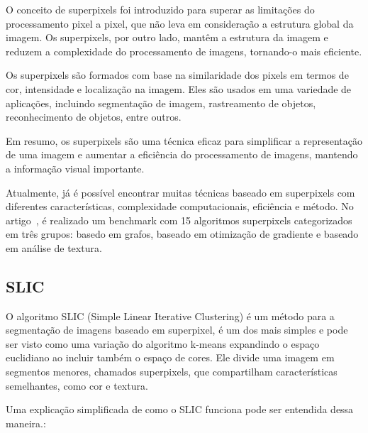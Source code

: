 O conceito de superpixels foi introduzido para superar as limitações
do processamento pixel a pixel, que não leva em consideração a
estrutura global da imagem. Os superpixels, por outro lado, mantêm a
estrutura da imagem e reduzem a complexidade do processamento de
imagens, tornando-o mais eficiente.

Os superpixels são formados com base na similaridade dos pixels em
termos de cor, intensidade e localização na imagem. Eles são usados em
uma variedade de aplicações, incluindo segmentação de imagem,
rastreamento de objetos, reconhecimento de objetos, entre outros.

Em resumo, os superpixels são uma técnica eficaz para simplificar a
representação de uma imagem e aumentar a eficiência do processamento
de imagens, mantendo a informação visual importante.

Atualmente, já é possível encontrar muitas técnicas baseado em
superpixels com diferentes características, complexidade
computacionais, eficiência e método. No
artigo~\cite{SuperPixelBenchmark2017}, é realizado um benchmark com 15
algoritmos superpixels categorizados em três grupos: basedo em grafos,
baseado em otimização de gradiente e baseado em análise de textura.

\subsection{SLIC}\label{sec:teorica-superpixel-slic}


O algoritmo SLIC (Simple Linear Iterative Clustering) é um método para
a segmentação de imagens baseado em superpixel, é um dos mais simples
e pode ser visto como uma variação do algoritmo k-means expandindo o
espaço euclidiano ao incluir também o espaço de cores. Ele divide uma
imagem em segmentos menores, chamados superpixels, que compartilham
características semelhantes, como cor e textura.

Uma explicação simplificada de como o SLIC funciona pode ser entendida
dessa maneira.:

